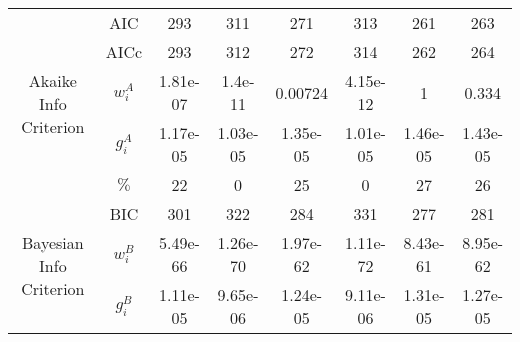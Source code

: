 \begin{tabular}{|cc|c|c|c|c|c|c|}
\cline{1-8}
\hline \multirow{5}{*}{Akaike Info Criterion} & AIC &                                      293 &                                      311 &                                      271 &                                      313 &                                      261 &                                      263 \\
          & AICc &                                      293 &                                      312 &                                      272 &                                      314 &                                      262 &                                      264 \\
          & $w_i^A$ &                                 1.81e-07 &                                  1.4e-11 &                                  0.00724 &                                 4.15e-12 &                                        1 &                                    0.334 \\
          & $g_i^A$ &                                 1.17e-05 &                                 1.03e-05 &                                 1.35e-05 &                                 1.01e-05 &                                 1.46e-05 &                                 1.43e-05 \\
          & $\%$ &                                       22 &                                        0 &                                       25 &                                        0 &                                       27 &                                       26 \\
\cline{1-8}
\hline \multirow{4}{*}{Bayesian Info Criterion} & BIC &                                      301 &                                      322 &                                      284 &                                      331 &                                      277 &                                      281 \\
          & $w_i^B$ &                                 5.49e-66 &                                 1.26e-70 &                                 1.97e-62 &                                 1.11e-72 &                                 8.43e-61 &                                 8.95e-62 \\
          & $g_i^B$ &                                 1.11e-05 &                                 9.65e-06 &                                 1.24e-05 &                                 9.11e-06 &                                 1.31e-05 &                                 1.27e-05 \\

\end{tabular}
